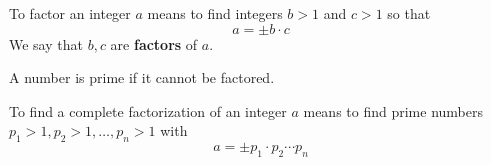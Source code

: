 \begin{frame}
\begin{definition}
To factor an integer $a$ means to find integers $b > 1$ and $c > 1$ so that 
\[
a = \pm b\cdot c
\]
We say that $b, c$ are \textbf{factors} of $a$.
\end{definition}
\begin{definition}
A number is prime if it cannot be factored.
\end{definition}
\begin{definition}
To find a complete factorization of an integer $a$ means to find prime numbers $p_1 > 1, p_2 > 1,\dots, p_n > 1$ with
\[
a =\pm p_1\cdot p_2\cdots p_n
\]
\end{definition}
\end{frame}